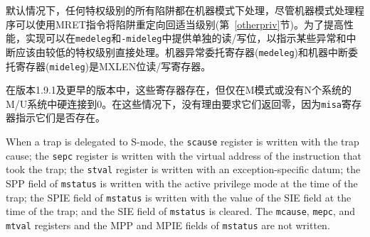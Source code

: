 \iffalse
By default, all traps at any privilege level are handled in machine
mode, though a machine-mode handler can redirect traps back to the
appropriate level with the MRET instruction (Section~\ref{otherpriv}).
To increase performance, implementations can provide individual
read/write bits within {\tt medeleg} and {\tt mideleg} to indicate
that certain exceptions and interrupts should be processed directly by
a lower privilege level.  The machine exception delegation register
({\tt medeleg}) and machine interrupt delegation register ({\tt
  mideleg}) are MXLEN-bit read/write registers.

In systems with S-mode, the {\tt medeleg} and {\tt mideleg} registers
must exist, and setting a bit in
{\tt medeleg} or {\tt mideleg} will delegate the corresponding trap, when
occurring in S-mode or U-mode, to the S-mode trap handler.
In systems without S-mode, the {\tt medeleg} and {\tt mideleg} registers
should not exist.
\fi

默认情况下，任何特权级别的所有陷阱都在机器模式下处理，尽管机器模式处理程序可以使用MRET指令将陷阱重定向回适当级别(第~\ref{otherpriv}节)。为了提高性能，实现可以在{\tt medeleg}和{\tt-mideleg}中提供单独的读/写位，以指示某些异常和中断应该由较低的特权级别直接处理。机器异常委托寄存器({\tt medeleg})和机器中断委托寄存器({\tt mideleg})是MXLEN位读/写寄存器。

\iffalse
\begin{commentary}
  In versions 1.9.1 and earlier , these registers existed but were
  hardwired to zero in M-mode only, or M/U without N systems.  There
  is no reason to require they return zero in those cases, as the {\tt
    misa} register indicates whether they exist.
\end{commentary}
\fi

\begin{commentary}
 在版本1.9.1及更早的版本中，这些寄存器存在，但仅在M模式或没有N个系统的M/U系统中硬连接到0。在这些情况下，没有理由要求它们返回零，因为{\tt misa}寄存器指示它们是否存在。
\end{commentary}

\iffalse
When a trap is delegated to S-mode, the
{\tt scause} register is written with the trap cause; the
{\tt sepc} register is written with the virtual address of
the instruction that took the trap; the
{\tt stval} register is written with an
exception-specific datum; the SPP field
of {\tt mstatus} is written with the active privilege mode at the time of
the trap; the SPIE field of {\tt mstatus} is written with the
value of the SIE field at the time of the trap; and
the SIE field of {\tt mstatus} is cleared.
The {\tt mcause}, {\tt mepc}, and {\tt mtval} registers and the MPP and
MPIE fields of {\tt mstatus} are not written.

